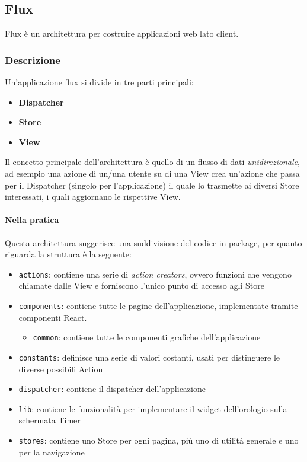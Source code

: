 
\subsection{Flux}

Flux è un architettura per costruire applicazioni web lato client.

\subsubsection{Descrizione}
Un'applicazione flux si divide in tre parti principali:

\begin{itemize}
\item \textbf{Dispatcher}
\item \textbf{Store}
\item \textbf{View}
\end{itemize}

Il concetto principale dell'architettura è quello di un flusso di dati \textit{unidirezionale},
ad esempio una azione di un/una utente su di una View crea un'azione che passa per il Dispatcher
(singolo per l'applicazione) il quale lo trasmette ai diversi Store interessati, i quali
aggiornano le rispettive View.

\paragraph{Nella pratica}
Questa architettura suggerisce una suddivisione del codice in package, per quanto riguarda
\fiscoloMobile{} la struttura è la seguente:

\begin{itemize}
\item \texttt{actions}: contiene una serie di \textit{action creators}, ovvero funzioni
che vengono chiamate dalle View e forniscono l'unico punto di accesso agli Store
\item \texttt{components}: contiene tutte le pagine dell'applicazione, implementate tramite
componenti React.
	\begin{itemize}
	\item \texttt{common}: contiene tutte le componenti grafiche dell'applicazione
	\end{itemize}
\item \texttt{constants}: definisce una serie di valori costanti, usati per distinguere
le diverse possibili Action
\item \texttt{dispatcher}: contiene il dispatcher dell'applicazione
\item \texttt{lib}: contiene le funzionalità per implementare il widget dell'orologio sulla schermata Timer
\item \texttt{stores}: contiene uno Store per ogni pagina, più uno di utilità generale e uno
per la navigazione
\end{itemize}

